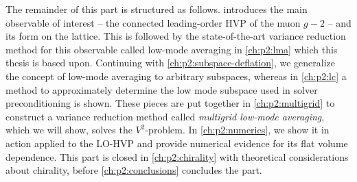 The remainder of this part is structured as follows.
 introduces the main observable of interest -- the connected leading-order HVP of the muon $g-2$ -- and its form on the lattice.
This is followed by the state-of-the-art variance reduction method for this observable called low-mode averaging in \cref{ch:p2:lma} which this thesis is based upon.
Continuing with \cref{ch:p2:subspace-deflation}, we generalize the concept of low-mode averaging to arbitrary subspaces, whereas in \cref{ch:p2:lc} a method to approximately determine the low mode subspace used in solver preconditioning is shown.
These pieces are put together in \cref{ch:p2:multigrid} to construct a variance reduction method called \emph{multigrid low-mode averaging}, which we will show, solves the $V^{2}$-problem.
In \cref{ch:p2:numerics}, we show it in action applied to the LO-HVP and provide numerical evidence for its flat volume dependence.
This part is closed in \cref{ch:p2:chirality} with theoretical considerations about chirality, before \cref{ch:p2:conclusions} concludes the part.


